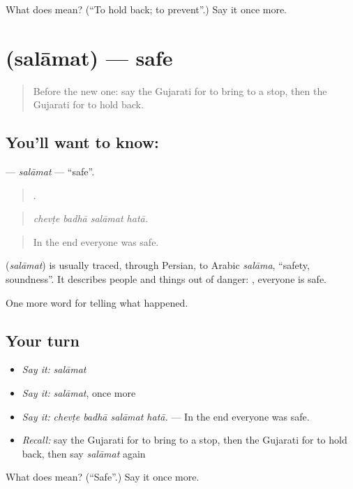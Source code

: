 \begin{tcolorbox}[breakable,colback=teal!4,colframe=teal!35!black,title={Before you move on}]
What does  mean? (\textquotedblleft{}To hold back; to prevent\textquotedblright{}.) Say it once more.
\end{tcolorbox}
\section[\texorpdfstring{\gu{સલામત} (salāmat)}{સલામત (salāmat)}]{ (salāmat) — safe}

\label{lesson:GU-C299-salamat}



\begin{quote}
Before the new one: say the Gujarati for to bring to a stop, then the Gujarati for to hold back.
\end{quote}

\subsection*{You'll want to know: }
\textbf{} — \emph{salāmat} — \textquotedblleft{}safe\textquotedblright{}.

\begin{quote}
   .
\end{quote}

\begin{quote}
\emph{chevṭe badhā salāmat hatā.}
\end{quote}

\begin{quote}
In the end everyone was safe.
\end{quote}

\begin{cousinweb}
\textbf{} (\emph{salāmat}) is usually traced, through Persian, to Arabic \emph{salāma}, \textquotedblleft{}safety, soundness\textquotedblright{}. It describes people and things out of danger: \textbf{  }, everyone is safe.
\end{cousinweb}

\begin{grammarlens}[title={What you've built}]
One more word for telling what happened.
\end{grammarlens}

\subsection*{Your turn}
\begin{itemize}
\raggedright
  \item \emph{Say it:} \emph{salāmat}
  \item \emph{Say it:} \emph{salāmat}, once more
  \item \emph{Say it:} \emph{chevṭe badhā salāmat hatā.} — In the end everyone was safe.
  \item \emph{Recall:} say the Gujarati for to bring to a stop, then the Gujarati for to hold back, then say \emph{salāmat} again
\end{itemize}

\begin{tcolorbox}[breakable,colback=teal!4,colframe=teal!35!black,title={Before you move on}]
What does  mean? (\textquotedblleft{}Safe\textquotedblright{}.) Say it once more.
\end{tcolorbox}
